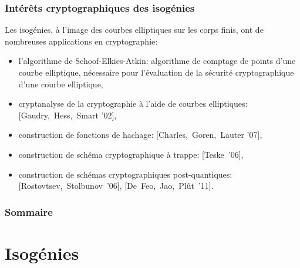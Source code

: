 \documentclass[10pt,a4paper]{beamer}
\theoremstyle{plain}
\theoremstyle{definition}
\theoremstyle{definition}
\theoremstyle{definition}
\theoremstyle{definition}
\theoremstyle{remark}
\theoremstyle{remark}
\newcommand{\bluebox}[2]{
\setbeamercolor{upperblue}{fg=white,bg=blue}
\setbeamercolor{lowercol}{fg=black,bg=pacificcream}

\begin{beamerboxesrounded}[upper=upperblue,lower=lowercol,shadow=true]{
#1 }  #2
\end{beamerboxesrounded} }
\begin{document}
\begin{frame}
\frametitle{Intérêts cryptographiques des isogénies}

Les isogénies, à l'image des courbes elliptiques sur les corps finis, ont de nombreuses 
applications en cryptographie: 
\begin{itemize}
\item l'algorithme de Schoof-Elkies-Atkin: algorithme de comptage de points
d'une courbe elliptique, nécessaire pour l'évaluation de la sécurité 
cryptographique d'une courbe elliptique,
\pause
\item cryptanalyse de la cryptographie à l'aide de courbes elliptiques: [Gaudry,~Hess,~Smart '02],
\pause
\item construction de fonctions de hachage: [Charles,~Goren,~Lauter '07],
\pause
\item construction de schéma cryptographique à trappe: [Teske~'06],
\pause
\item construction de schémas cryptographiques post-quantiques: [Rostovtsev,~Stolbunov~'06], [De~Feo,~Jao,~Pl\^ut~'11].
\end{itemize}
\end{frame}

\begin{frame}
\frametitle{Sommaire}
\tableofcontents
\end{frame}

\section{Isogénies}
\end{document}

